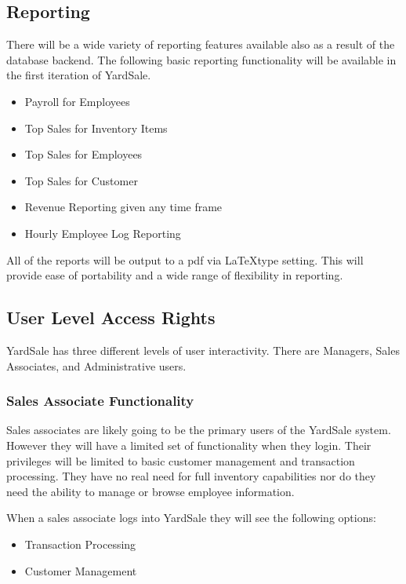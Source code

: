 \documentclass{report}
\begin{document}
    \subsection{Reporting}
    There will be a wide variety of reporting features available also
    as a result of the database backend. The following basic reporting
    functionality will be available in the first iteration of
    YardSale.

    \begin{itemize}
        \item{Payroll for Employees}
        \item{Top Sales for Inventory Items}
        \item{Top Sales for Employees}
        \item{Top Sales for Customer}
        \item{Revenue Reporting given any time frame}
        \item{Hourly Employee Log Reporting}
    \end{itemize}

    All of the reports will be output to a pdf via \LaTeX type
    setting. This will provide ease of portability and a wide range of
    flexibility in reporting.

    \subsection{User Level Access Rights}
    YardSale has three different levels of user interactivity. There
    are Managers, Sales Associates, and Administrative users.

    \subsubsection{Sales Associate Functionality}
    Sales associates are likely going to be the primary users of the
    YardSale system. However they will have a limited set of
    functionality when they login. Their privileges will be limited to
    basic customer management and transaction processing. They have no
    real need for full inventory capabilities nor do they need the
    ability to manage or browse employee information.

    When a sales associate logs into YardSale they will see the following options:

    \begin{itemize}
        \item Transaction Processing
        \item Customer Management
    \end{itemize}
\end{document}
